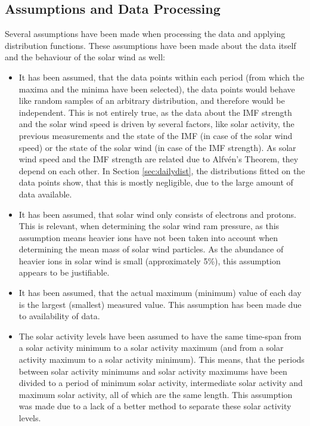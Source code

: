 \documentclass[12pt]{article}
\begin{document}
    \subsection{Assumptions and Data Processing}\label{sec:dataproc}
        Several assumptions have been made when processing the data and applying distribution functions. These assumptions have been made about the data itself and the behaviour of the solar wind as well:
        \begin{itemize}
            \item It has been assumed, that the data points within each period (from which the maxima and the minima have been selected), the data points would behave like random samples of an arbitrary distribution, and therefore would be independent. This is not entirely true, as the data about the IMF strength and the solar wind speed is driven by several factors, like solar activity, the previous measurements and the state of the IMF (in case of the solar wind speed) or the state of the solar wind (in case of the IMF strength). As solar wind speed and the IMF strength are related due to Alfvén's Theorem\cite{1976alfven}, they depend on each other. In Section \ref{sec:dailydist}, the distributions fitted on the data points show, that this is mostly negligible, due to the large amount of data available.
            \item It has been assumed, that solar wind only consists of electrons and protons. This is relevant, when determining the solar wind ram pressure, as this assumption means heavier ions have not been taken into account when determining the mean mass of solar wind particles. As the abundance of heavier ions in solar wind is small (approximately 5\%\cite{2006schwenn}), this assumption appears to be justifiable.
            \item It has been assumed, that the actual maximum (minimum) value of each day is the largest (smallest) measured value. This assumption has been made due to availability of data.
            \item The solar activity levels have been assumed to have the same time-span from a solar activity minimum to a solar activity maximum (and from a solar activity maximum to a solar activity minimum). This means, that the periods between solar activity minimums and solar activity maximums have been divided to a period of minimum solar activity, intermediate solar activity and maximum solar activity, all of which are the same length. This assumption was made due to a lack of a better method to separate these solar activity levels.
        \end{itemize}\\
\end{document}
